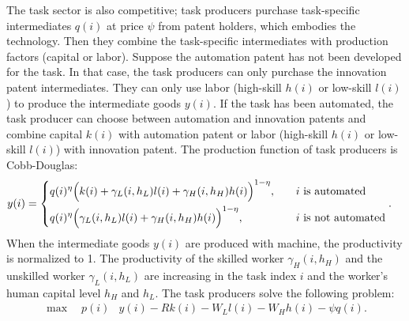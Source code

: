 \documentclass[12pt]{article}
\begin{document}
The task sector is also competitive; task producers purchase task-specific intermediates $q(i)$ at price $\psi$ from patent holders, which embodies the technology. Then they combine the task-specific intermediates with production factors (capital or labor). Suppose the automation patent has not been developed for the task. In that case, the task producers can only purchase the innovation patent intermediates. They can only use labor (high-skill $h(i)$ or low-skill $l(i)$) to produce the intermediate goods $y(i)$. If the task has been automated, the task producer can choose between automation and innovation patents and combine capital $k(i)$ with automation patent or labor (high-skill $h(i)$ or low-skill $l(i)$) with innovation patent. The production function of task producers is Cobb-Douglas:
\begin{align*}
y(i) &= 
\begin{dcases}
q(i)^{\eta}\Big(k(i) + \gamma_L(i,h_L)l(i)+\gamma_H(i,h_H)h(i)\Big)^{1-\eta} , &\quad \text{$i$ is automated}  \\
q(i)^{\eta}\Big(\gamma_L(i,h_L)l(i)+\gamma_H(i,h_H)h(i)\Big)^{1-\eta} ,&\quad \text{$i$ is not automated}
\end{dcases}. 
\end{align*}
When the intermediate goods $y(i)$ are produced with machine, the productivity is normalized to 1. The productivity of the skilled worker $\gamma_H(i,h_H)$ and the unskilled worker $\gamma_L(i,h_L)$ are increasing in the task index $i$ and the worker's human capital level $h_H$ and $h_L$. 
The task producers solve the following problem:
\begin{align*}
\max \quad  p(i)&y(i)-Rk(i)-W_Ll(i)-W_Hh(i)-\psi q(i).
\end{align*}
\end{document}
